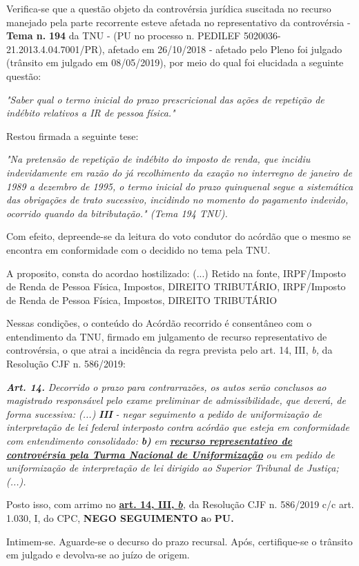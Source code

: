 \documentclass[12pt]{article}
\begin{document}
\justifying
\noindent Verifica-se que a questão objeto da controvérsia jurídica suscitada no recurso manejado pela parte recorrente esteve afetada no representativo da controvérsia - \textbf{Tema n. }\textbf{194} da TNU - (PU no processo n. PEDILEF 5020036-21.2013.4.04.7001/PR),  afetado em 26/10/2018 - afetado pelo Pleno foi julgado (trânsito em julgado em 08/05/2019), por meio do qual foi elucidada a seguinte questão:

\noindent \textit{"Saber qual o termo inicial do prazo prescricional das ações de repetição de indébito relativos a IR de pessoa física."}

\noindent Restou firmada a seguinte tese:

\noindent \textit{"Na pretensão de repetição de indébito do imposto de renda, que incidiu indevidamente em razão do já recolhimento da exação no interregno de janeiro de 1989 a dezembro de 1995, o termo inicial do prazo quinquenal segue a sistemática das obrigações de trato sucessivo, incidindo no momento do pagamento indevido, ocorrido quando da bitributação." (Tema 194 TNU).}

\noindent Com efeito, depreende-se da leitura do voto condutor do acórdão que o mesmo se encontra em conformidade com o decidido no  tema pela TNU.

\noindent A proposito, consta do acordao hostilizado: (...) Retido na fonte, IRPF/Imposto de Renda de Pessoa Física, Impostos, DIREITO TRIBUTÁRIO, IRPF/Imposto de Renda de Pessoa Física, Impostos, DIREITO TRIBUTÁRIO

\noindent Nessas condições, o conteúdo do Acórdão recorrido é consentâneo com o entendimento da TNU, firmado em julgamento de recurso representativo de controvérsia, o que atrai a incidência da regra prevista pelo art. 14, III, \textit{b,} da Resolução CJF n. 586/2019:

\noindent \textit{\textbf{Art. 14.}}\textit{ Decorrido o prazo para contrarrazões, os autos serão conclusos ao magistrado responsável pelo exame preliminar de admissibilidade, que deverá, de forma sucessiva: (...) }\textit{\textbf{III }}\textit{- negar seguimento a pedido de uniformização de interpretação de lei federal interposto contra acórdão que esteja em conformidade com entendimento consolidado: }\textit{\textbf{b)}}\textit{ em }\uline{\textit{\textbf{recurso representativo de controvérsia pela Turma Nacional de Uniformização}}}\textit{ ou em pedido de uniformização de interpretação de lei dirigido ao Superior Tribunal de Justiça;(...).}

\noindent Posto isso, com arrimo no \uline{\textbf{art. 14, III, }}\uline{\textit{\textbf{b}}}\textit{,} da Resolução CJF n. 586/2019 c/c art. 1.030, I, do CPC, \textbf{NEGO SEGUIMENTO }\textbf{a}o\textbf{ PU}\textbf{.}

\noindent Intimem-se. Aguarde-se o decurso do prazo recursal. Após, certifique-se o trânsito em julgado e devolva-se ao juízo de origem.
\end{document}
